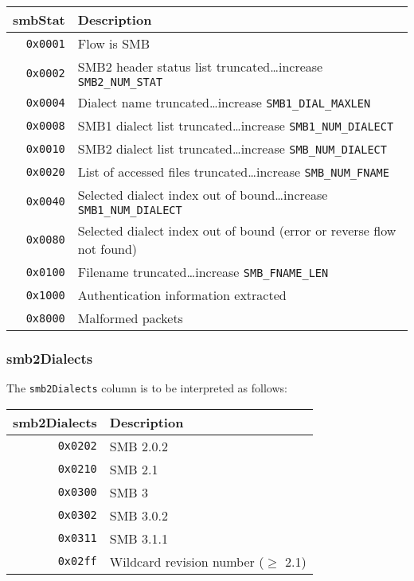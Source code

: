 \documentclass[documentation]{subfiles}
\begin{document}
\begin{longtable}{rl}
    \toprule
    {\bf smbStat} & {\bf Description}\\
    \midrule\endhead%
    {\tt 0x0001} & Flow is SMB\\
    {\tt 0x0002} & SMB2 header status list truncated\ldots increase {\tt SMB2\_NUM\_STAT}\\
    {\tt 0x0004} & Dialect name truncated\ldots increase {\tt SMB1\_DIAL\_MAXLEN}\\
    {\tt 0x0008} & SMB1 dialect list truncated\ldots increase {\tt SMB1\_NUM\_DIALECT}\\
    {\tt 0x0010} & SMB2 dialect list truncated\ldots increase {\tt SMB\_NUM\_DIALECT}\\
    {\tt 0x0020} & List of accessed files truncated\ldots increase {\tt SMB\_NUM\_FNAME}\\
    {\tt 0x0040} & Selected dialect index out of bound\ldots increase {\tt SMB1\_NUM\_DIALECT}\\
    {\tt 0x0080} & Selected dialect index out of bound (error or reverse flow not found)\\
    {\tt 0x0100} & Filename truncated\ldots increase {\tt SMB\_FNAME\_LEN}\\
    {\tt 0x1000} & Authentication information extracted\\
    {\tt 0x8000} & Malformed packets\\
    \bottomrule
\end{longtable}

\subsubsection{smb2Dialects}\label{smb2Dialects}
The {\tt smb2Dialects} column is to be interpreted as follows:

\begin{longtable}{rl}
    \toprule
    {\bf smb2Dialects} & {\bf Description}\\
    \midrule\endhead%
    {\tt 0x0202} & SMB 2.0.2\\
    {\tt 0x0210} & SMB 2.1\\
    {\tt 0x0300} & SMB 3\\
    {\tt 0x0302} & SMB 3.0.2\\
    {\tt 0x0311} & SMB 3.1.1\\
    {\tt 0x02ff} & Wildcard revision number ($\geq$ 2.1)\\
    \bottomrule
\end{longtable}
\end{document}
